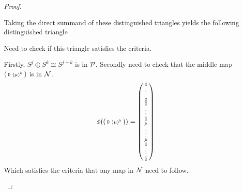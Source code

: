 \begin{proof}
\begin{enumerate}
{            Taking the direct summand of these distinguished triangles yields the following distinguished triangle
            \begin{center}
            \end{center}
            Need to check if this triangle satisfies the criteria.
            
            Firstly, \( S^j \oplus S^k \cong S^{j + k} \) is in \( {\mathcal{P}} \). Secondly need to check that the middle map \( 
                \begin{psmallmatrix}
                    0 & ( \mu )^k
                \end{psmallmatrix} 
                \) is in \( {\mathcal{N}} \).
            \[
                \phi(
                    \begin{psmallmatrix}
                        0 & ( \mu )^k
                    \end{psmallmatrix}
                    ) =
                \begin{psmallmatrix}
                    0 \\
                    \vdots \\
                    0 \\
                    0 \\
                    \vdots \\
                    0 \\
                    \mu \\
                    \vdots \\
                    \mu \\
                    0 \\
                    \vdots \\
                    0
                \end{psmallmatrix}
            \]
            Which satisfies the criteria that any map in \( {\mathcal{N}} \) need to follow.

}
\end{enumerate}
\end{proof}
